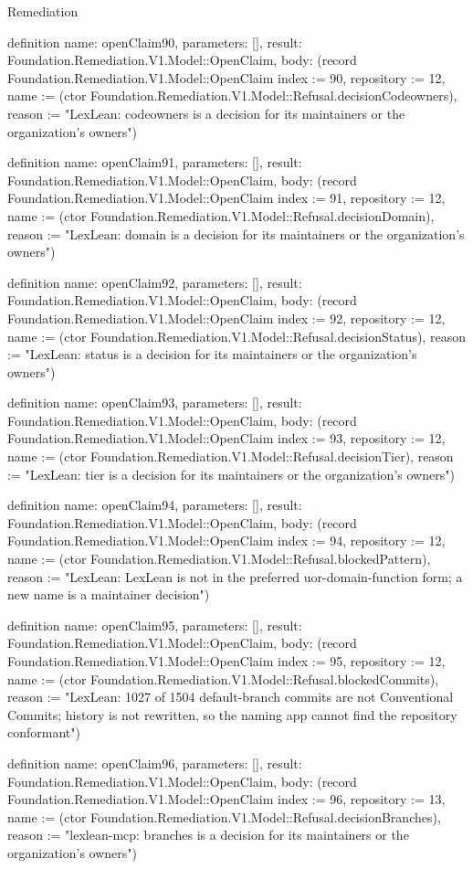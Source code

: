 \begin{lexlean}{Remediation}
\begin{semanticmodule}
definition{
  name: openClaim90,
  parameters: [],
  result: Foundation.Remediation.V1.Model::OpenClaim,
  body: (record Foundation.Remediation.V1.Model::OpenClaim {index := 90, repository := 12, name := (ctor Foundation.Remediation.V1.Model::Refusal.decisionCodeowners), reason := "LexLean: codeowners is a decision for its maintainers or the organization's owners"})
}

definition{
  name: openClaim91,
  parameters: [],
  result: Foundation.Remediation.V1.Model::OpenClaim,
  body: (record Foundation.Remediation.V1.Model::OpenClaim {index := 91, repository := 12, name := (ctor Foundation.Remediation.V1.Model::Refusal.decisionDomain), reason := "LexLean: domain is a decision for its maintainers or the organization's owners"})
}

definition{
  name: openClaim92,
  parameters: [],
  result: Foundation.Remediation.V1.Model::OpenClaim,
  body: (record Foundation.Remediation.V1.Model::OpenClaim {index := 92, repository := 12, name := (ctor Foundation.Remediation.V1.Model::Refusal.decisionStatus), reason := "LexLean: status is a decision for its maintainers or the organization's owners"})
}

definition{
  name: openClaim93,
  parameters: [],
  result: Foundation.Remediation.V1.Model::OpenClaim,
  body: (record Foundation.Remediation.V1.Model::OpenClaim {index := 93, repository := 12, name := (ctor Foundation.Remediation.V1.Model::Refusal.decisionTier), reason := "LexLean: tier is a decision for its maintainers or the organization's owners"})
}

definition{
  name: openClaim94,
  parameters: [],
  result: Foundation.Remediation.V1.Model::OpenClaim,
  body: (record Foundation.Remediation.V1.Model::OpenClaim {index := 94, repository := 12, name := (ctor Foundation.Remediation.V1.Model::Refusal.blockedPattern), reason := "LexLean: LexLean is not in the preferred uor-{domain}-{function} form; a new name is a maintainer decision"})
}

definition{
  name: openClaim95,
  parameters: [],
  result: Foundation.Remediation.V1.Model::OpenClaim,
  body: (record Foundation.Remediation.V1.Model::OpenClaim {index := 95, repository := 12, name := (ctor Foundation.Remediation.V1.Model::Refusal.blockedCommits), reason := "LexLean: 1027 of 1504 default-branch commits are not Conventional Commits; history is not rewritten, so the naming app cannot find the repository conformant"})
}

definition{
  name: openClaim96,
  parameters: [],
  result: Foundation.Remediation.V1.Model::OpenClaim,
  body: (record Foundation.Remediation.V1.Model::OpenClaim {index := 96, repository := 13, name := (ctor Foundation.Remediation.V1.Model::Refusal.decisionBranches), reason := "lexlean-mcp: branches is a decision for its maintainers or the organization's owners"})
}


\end{semanticmodule}
\end{lexlean}

